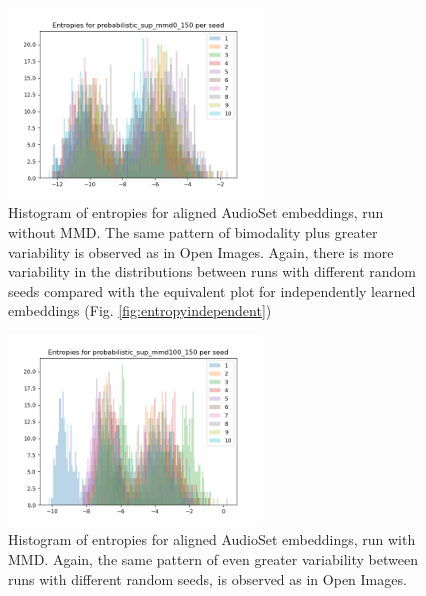 \begin{figure}[H]
    \centering
    \includegraphics[width=0.6\textwidth]{images/method/probabilistic_aligned/audioset/probabilistic_sup_mmd0_150_entropies.png}
    \caption{
        Histogram of entropies for aligned AudioSet embeddings, run without MMD. The same pattern of bimodality plus greater variability is observed as in Open Images. Again, there is more variability in the distributions between runs with different random seeds compared with the equivalent plot for independently learned embeddings (Fig. \ref{fig:entropyindependent})
    }
\end{figure}

\begin{figure}[H]
    \centering
    \includegraphics[width=0.6\textwidth]{images/method/probabilistic_aligned/audioset/probabilistic_sup_mmd100_150_entropies.png}
    \caption{
        Histogram of entropies for aligned AudioSet embeddings, run with MMD. Again, the same pattern of even greater variability between runs with different random seeds, is observed as in Open Images. 
    }
\end{figure}

